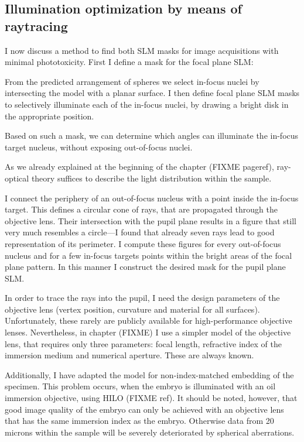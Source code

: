 \subsection{Illumination optimization by means of raytracing}
I now discuss a method to find both SLM masks for image acquisitions
with minimal phototoxicity. First I define a mask for the focal plane
SLM:

From the predicted arrangement of spheres we select in-focus nuclei
by intersecting the model with a planar surface. I then define focal
plane SLM masks to selectively illuminate each of the in-focus nuclei,
by drawing a bright disk in the appropriate position.

Based on such a mask, we can determine which angles can illuminate the
in-focus target nucleus, without exposing out-of-focus nuclei.

As we already explained at the beginning of the chapter (FIXME
pageref), ray-optical theory suffices to describe the light
distribution within the sample.

I connect the periphery of an out-of-focus nucleus with a point
inside the in-focus target. This defines a circular cone of rays, that
are propagated through the objective lens. Their
intersection with the pupil plane results in a figure that still very
much resembles a circle---I found that already seven rays lead to good
representation of its perimeter.  I compute these figures for every
out-of-focus nucleus and for a few in-focus targets points within the
bright areas of the focal plane pattern. In this manner I construct
the desired mask for the pupil plane SLM.

In order to trace the rays into the pupil, I need the design parameters of
the objective lens (vertex position, curvature and material for all
surfaces). Unfortunately, these rarely are publicly
available for high-performance objective lenses. Nevertheless, in
chapter (FIXME) I use a simpler model of the objective lens, that
requires only three parameters: focal length, refractive index of the
immersion medium and numerical aperture. These are always known.

Additionally, I have adapted the model for non-index-matched
embedding of the specimen. This problem occurs, when the embryo is
illuminated with an oil immersion objective, using HILO (FIXME
ref). It should be noted, however, that good image quality of the
embryo can only be achieved with an objective lens that has the same
immersion index as the embryo. Otherwise data from 20 microns within
the sample will be severely deteriorated by spherical aberrations.
